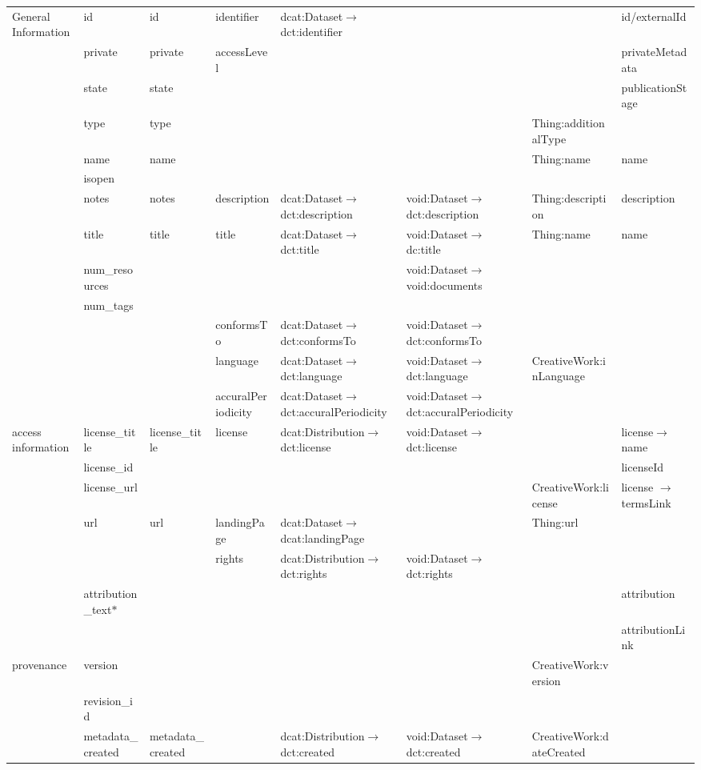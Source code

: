 \begin{landscape}
{\begin{longtable}{|p{1cm}|m{3.1cm}|m{2.4cm}|m{2.5cm}|p{3.8cm}|m{3.8cm}|m{5.55cm}|m{2.5cm}|}
\multirow{13}{2cm}{General Information} & id & id & identifier & dcat:Dataset$\rightarrow$ dct:identifier &  &  & id/externalId\tabularnewline
\cline{2-8}
 & private & private & accessLevel &  &  &  & privateMetadata\tabularnewline
\cline{2-8}
 & state & state &  &  &  &  & publicationStage\tabularnewline
\cline{2-8}
 & type & type &  &  &  & Thing:additionalType & \tabularnewline
\cline{2-8}
 & name & name &  &  &  & Thing:name & name\tabularnewline
\cline{2-8}
 & isopen &  &  &  &  &  & \tabularnewline
\cline{2-8}
 & notes & notes & description & dcat:Dataset$\rightarrow$ dct:description & void:Dataset$\rightarrow$ dct:description & Thing:description & description\tabularnewline
\cline{2-8}
 & title & title & title & dcat:Dataset$\rightarrow$ dct:title & void:Dataset$\rightarrow$ dc:title & Thing:name & name\tabularnewline
\cline{2-8}
 & num\_resources &  &  &  & void:Dataset$\rightarrow$ void:documents &  & \tabularnewline
\cline{2-8}
 & num\_tags &  &  &  &  &  & \tabularnewline
\cline{2-8}
 &  &  & conformsTo & dcat:Dataset$\rightarrow$ dct:conformsTo & void:Dataset$\rightarrow$ dct:conformsTo &  & \tabularnewline
\cline{2-8}
 &  &  & language & dcat:Dataset$\rightarrow$ dct:language & void:Dataset$\rightarrow$ dct:language & CreativeWork:inLanguage & \tabularnewline
\cline{2-8}
 &  &  & accuralPeriodicity & dcat:Dataset$\rightarrow$ dct:accuralPeriodicity & void:Dataset$\rightarrow$ dct:accuralPeriodicity &  & \tabularnewline
\hline
\multirow{7}{2cm}{access information} & license\_title & license\_title & license & dcat:Distribution$\rightarrow$ dct:license & void:Dataset$\rightarrow$ dct:license &  & license$\rightarrow$  name\tabularnewline
\cline{2-8}
 & license\_id &  &  &  &  &  & licenseId\tabularnewline
\cline{2-8}
 & license\_url &  &  &  &  & CreativeWork:license & license $\rightarrow$  termsLink\tabularnewline
\cline{2-8}
 & url & url & landingPage & dcat:Dataset$\rightarrow$ dcat:landingPage &  & Thing:url & \tabularnewline
\cline{2-8}
 &  &  & rights & dcat:Distribution$\rightarrow$  dct:rights & void:Dataset$\rightarrow$ dct:rights &  & \tabularnewline
\cline{2-8}
 & attribution\_text$\ast$ &  &  &  &  &  & attribution\tabularnewline
\cline{2-8}
 &  &  &  &  &  &  & attributionLink\tabularnewline
\hline
\multirow{7}{2cm}{provenance} & version &  &  &  &  & CreativeWork:version & \tabularnewline
\cline{2-8}
 & revision\_id &  &  &  &  &  & \tabularnewline
\cline{2-8}
 & metadata\_created & metadata\_created &  & dcat:Distribution$\rightarrow$ dct:created & void:Dataset$\rightarrow$ dct:created & CreativeWork:dateCreated & \tabularnewline

\end{longtable}}
\end{landscape}
